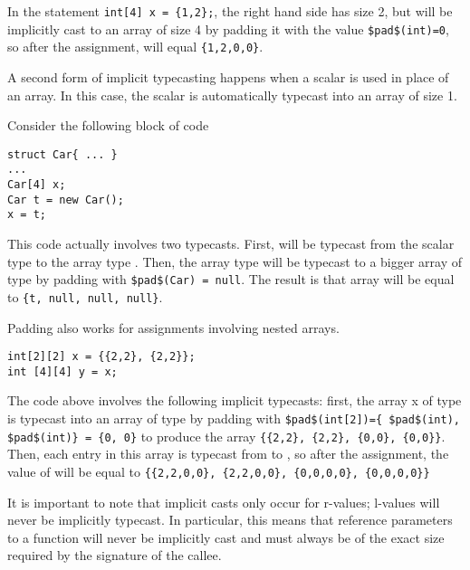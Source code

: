 \begin{Example}
In the statement \lstinline!int[4] x = {1,2};!, the right hand side has size 2, but will be implicitly cast to an array of size 4 by padding it with the value \lstinline!$pad$(int)=0!, so after the assignment,  will equal \lstinline!{1,2,0,0}!.
\end{Example}


A second form of implicit typecasting happens when a scalar is used in place of an array. In this case, the scalar is automatically typecast into an array of size 1. 

\begin{Example}
Consider the following block of code 
\begin{lstlisting}
struct Car{ ... }
...
Car[4] x;
Car t = new Car();
x = t;
\end{lstlisting}
This code actually involves two typecasts. First,  will be typecast from the scalar type  to the array type . Then, the array type  will be typecast to a bigger array of type  by padding with \lstinline!$pad$(Car) = null!. The result is that array will be equal to \lstinline!{t, null, null, null}!.
\end{Example}

\begin{Example}
Padding also works for assignments involving nested arrays.
\begin{lstlisting}
int[2][2] x = {{2,2}, {2,2}};
int [4][4] y = x;
\end{lstlisting}

The code above involves the following implicit typecasts: first, the array x of type  is typecast into an array of type  by padding with \lstinline!$pad$(int[2])={ $pad$(int), $pad$(int)} = {0, 0}! to produce the array \lstinline!{{2,2}, {2,2}, {0,0}, {0,0}}!. Then, each entry in this array is typecast from  to , so after the assignment, the value of  will be equal to \lstinline!{{2,2,0,0}, {2,2,0,0}, {0,0,0,0}, {0,0,0,0}}!
\end{Example}


It is important to note that implicit casts only occur for r-values; l-values will never be implicitly typecast. In particular, this means that reference parameters to a function will never be implicitly cast and must always be of the exact size required by the signature of the callee. 


